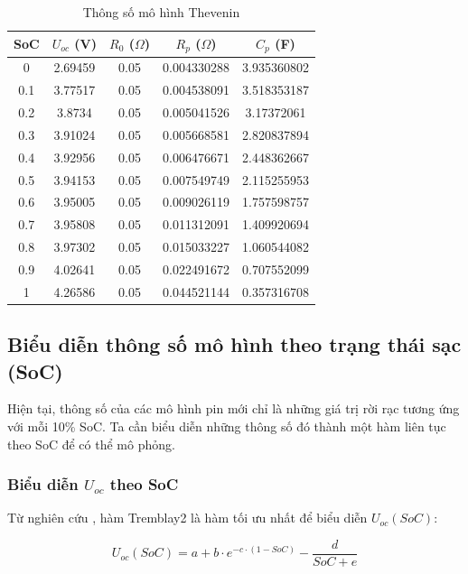 \documentclass{thesis}
\begin{document}
\begin{table}[H]
    \centering
    \begin{tabular}{|c|c|c|c|c|}
        \hline
        \textbf{SoC} & \textbf{$U_{oc}$ (V)} & \textbf{$R_0$ ($\Omega$)} & \textbf{$R_p$ ($\Omega$)} & \textbf{$C_p$ (F)} \\
        \hline
        0 & 2.69459 & 0.05 & 0.004330288 & 3.935360802 \\
        0.1 & 3.77517 & 0.05 & 0.004538091 & 3.518353187 \\
        0.2 & 3.8734 & 0.05 & 0.005041526 & 3.17372061 \\
        0.3 & 3.91024 & 0.05 & 0.005668581 & 2.820837894 \\
        0.4 & 3.92956 & 0.05 & 0.006476671 & 2.448362667 \\
        0.5 & 3.94153 & 0.05 & 0.007549749 & 2.115255953 \\
        0.6 & 3.95005 & 0.05 & 0.009026119 & 1.757598757 \\
        0.7 & 3.95808 & 0.05 & 0.011312091 & 1.409920694 \\
        0.8 & 3.97302 & 0.05 & 0.015033227 & 1.060544082 \\
        0.9 & 4.02641 & 0.05 & 0.022491672 & 0.707552099 \\
        1 & 4.26586 & 0.05 & 0.044521144 & 0.357316708 \\
        \hline
    \end{tabular}
    \caption{Thông số mô hình Thevenin}
    \label{tab:thevenin}
\end{table}


\subsection{Biểu diễn thông số mô hình theo trạng thái sạc (SoC)}
Hiện tại, thông số của các mô hình pin mới chỉ là những giá trị rời rạc tương ứng với mỗi 10\% SoC. Ta cần biểu diễn những thông số đó thành một hàm liên tục theo SoC để có thể mô phỏng.

\subsubsection{Biểu diễn $U_{oc}$ theo SoC}
Từ nghiên cứu \cite{bialon2023}, hàm Tremblay2 là hàm tối ưu nhất để biểu diễn \( U_{oc}(SoC) \):

\begin{equation}
U_{oc}(SoC) = a + b \cdot e^{-c \cdot (1 - SoC)} - \frac{d}{SoC + e} 
\end{equation}
\end{document}
